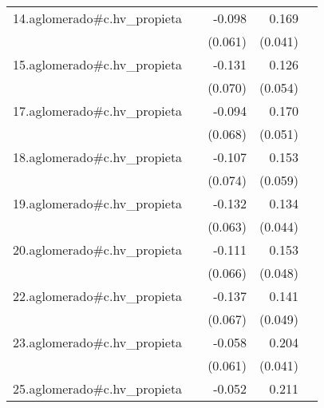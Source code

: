 {\begin{longtable}{l*{4}{D{.}{.}{-1}}}
\addlinespace
14.aglomerado#c.hv\_propieta&                     &      -0.098         &       0.169\sym{***}&                     \\
            &                     &     (0.061)         &     (0.041)         &                     \\
\addlinespace
15.aglomerado#c.hv\_propieta&                     &      -0.131         &       0.126\sym{*}  &                     \\
            &                     &     (0.070)         &     (0.054)         &                     \\
\addlinespace
17.aglomerado#c.hv\_propieta&                     &      -0.094         &       0.170\sym{***}&                     \\
            &                     &     (0.068)         &     (0.051)         &                     \\
\addlinespace
18.aglomerado#c.hv\_propieta&                     &      -0.107         &       0.153\sym{**} &                     \\
            &                     &     (0.074)         &     (0.059)         &                     \\
\addlinespace
19.aglomerado#c.hv\_propieta&                     &      -0.132\sym{*}  &       0.134\sym{**} &                     \\
            &                     &     (0.063)         &     (0.044)         &                     \\
\addlinespace
20.aglomerado#c.hv\_propieta&                     &      -0.111         &       0.153\sym{**} &                     \\
            &                     &     (0.066)         &     (0.048)         &                     \\
\addlinespace
22.aglomerado#c.hv\_propieta&                     &      -0.137\sym{*}  &       0.141\sym{**} &                     \\
            &                     &     (0.067)         &     (0.049)         &                     \\
\addlinespace
23.aglomerado#c.hv\_propieta&                     &      -0.058         &       0.204\sym{***}&                     \\
            &                     &     (0.061)         &     (0.041)         &                     \\
\addlinespace
25.aglomerado#c.hv\_propieta&                     &      -0.052         &       0.211\sym{***}&                     \\

\end{longtable}}
